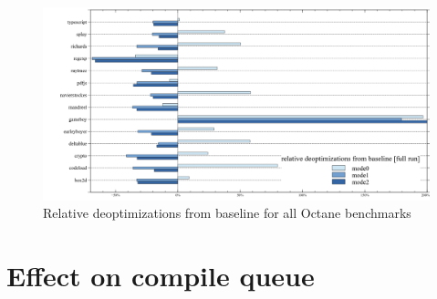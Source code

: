 \begin{figure}[ht]
  \begin{center}
    \centering
    \includegraphics[width=1.0\textwidth]{figures/octane_variation_deopt.png}
    \caption{Relative deoptimizations from baseline for all Octane benchmarks}
    \label{f:octane_variation_deopt}
  \end{center}
\end{figure}

\clearpage
\section{Effect on compile queue}
\label{s:perf_compilequeue}

